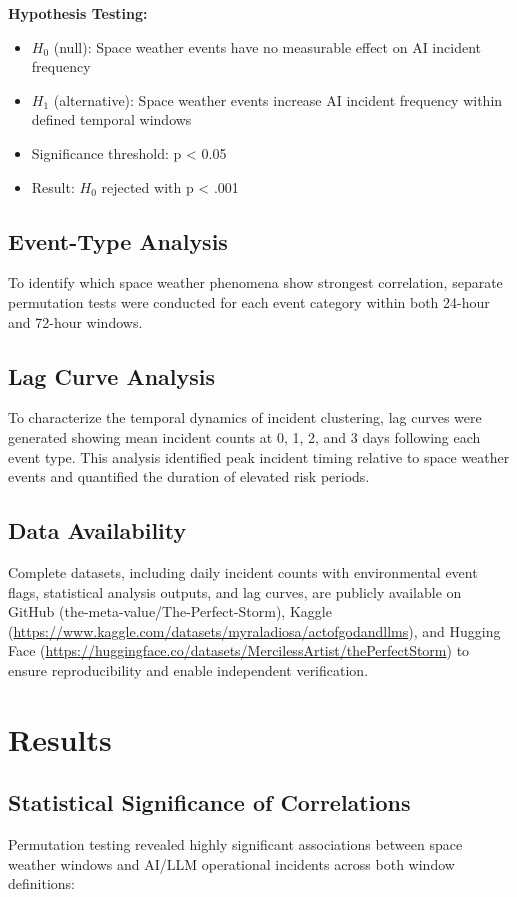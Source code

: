 \documentclass[11pt,a4paper]{article}
\begin{document}
\textbf{Hypothesis Testing:}
\begin{itemize}
\item $H_0$ (null): Space weather events have no measurable effect on AI incident frequency
\item $H_1$ (alternative): Space weather events increase AI incident frequency within defined temporal windows
\item Significance threshold: p < 0.05
\item Result: $H_0$ rejected with p < .001
\end{itemize}

\subsection{Event-Type Analysis}
To identify which space weather phenomena show strongest correlation, separate permutation tests were conducted for each event category within both 24-hour and 72-hour windows.

\subsection{Lag Curve Analysis}
To characterize the temporal dynamics of incident clustering, lag curves were generated showing mean incident counts at 0, 1, 2, and 3 days following each event type. This analysis identified peak incident timing relative to space weather events and quantified the duration of elevated risk periods.

\subsection{Data Availability}
Complete datasets, including daily incident counts with environmental event flags, statistical analysis outputs, and lag curves, are publicly available on GitHub (the-meta-value/The-Perfect-Storm), Kaggle (\url{https://www.kaggle.com/datasets/myraladiosa/actofgodandllms}), and Hugging Face (\url{https://huggingface.co/datasets/MercilessArtist/thePerfectStorm}) to ensure reproducibility and enable independent verification.

\section{Results}

\subsection{Statistical Significance of Correlations}
Permutation testing revealed highly significant associations between space weather windows and AI/LLM operational incidents across both window definitions:
\end{document}
